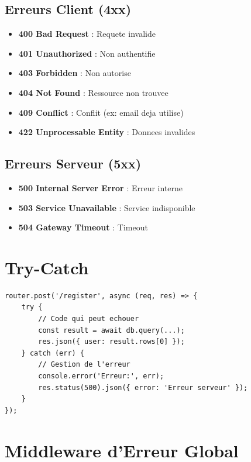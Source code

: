 \documentclass[a4paper,12pt]{book}
\begin{document}
\subsection{Erreurs Client (4xx)}

\begin{itemize}
    \item \textbf{400 Bad Request} : Requete invalide
    \item \textbf{401 Unauthorized} : Non authentifie
    \item \textbf{403 Forbidden} : Non autorise
    \item \textbf{404 Not Found} : Ressource non trouvee
    \item \textbf{409 Conflict} : Conflit (ex: email deja utilise)
    \item \textbf{422 Unprocessable Entity} : Donnees invalides
\end{itemize}

\subsection{Erreurs Serveur (5xx)}

\begin{itemize}
    \item \textbf{500 Internal Server Error} : Erreur interne
    \item \textbf{503 Service Unavailable} : Service indisponible
    \item \textbf{504 Gateway Timeout} : Timeout
\end{itemize}

\section{Try-Catch}

\begin{lstlisting}[style=javascript, caption=Gestion des erreurs avec try-catch]
router.post('/register', async (req, res) => {
    try {
        // Code qui peut echouer
        const result = await db.query(...);
        res.json({ user: result.rows[0] });
    } catch (err) {
        // Gestion de l'erreur
        console.error('Erreur:', err);
        res.status(500).json({ error: 'Erreur serveur' });
    }
});
\end{lstlisting}

\section{Middleware d'Erreur Global}
\end{document}
